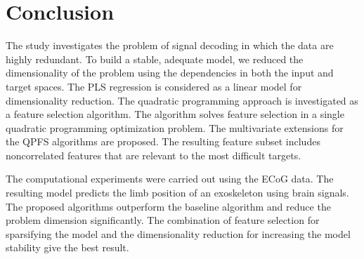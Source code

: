 \documentclass[12pt,twoside]{article}
\theoremstyle{definition}
\begin{document}
\section{Conclusion}
The study investigates the problem of signal decoding in which the data are highly redundant.
To build a stable, adequate model, we reduced the dimensionality of the problem using the dependencies in both the input and target spaces.
The PLS regression is considered as a linear model for dimensionality reduction.
The quadratic programming approach is investigated as a feature selection algorithm.
The algorithm solves feature selection in a single quadratic programming optimization problem.
The multivariate extensions for the QPFS algorithms are proposed.
The resulting feature subset includes noncorrelated features that are relevant to the most difficult targets.

The computational experiments were carried out using the ECoG data. 
The resulting model predicts the limb position of an exoskeleton using brain signals.
The proposed algorithms outperform the baseline algorithm and reduce the problem dimension significantly.
The combination of feature selection for sparsifying the model and the dimensionality reduction for increasing the model stability give the best result.



\end{document}
